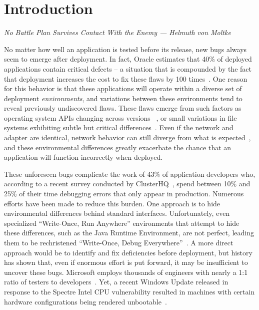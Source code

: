 \section{Introduction}
\label{SEC:introduction}
\textit{No Battle Plan Survives Contact With the Enemy --- Helmuth von Moltke}

No matter how well an application is tested before its release,
new bugs always seem to emerge after deployment.
In fact, Oracle estimates that 40\% of deployed applications
contain critical defects -- a situation that is compounded
by the fact that deployment
increases the cost to fix these flaws by 100 times~\cite{OracleAppQuality}.
One reason for this behavior
is that these applications will operate within a diverse set of
deployment \emph{environments},
and variations between these environments tend to
reveal previously undiscovered flaws.
These flaws emerge from
such factors as
operating system APIs changing across versions
~\cite{LinuxGlibcChanges},
or small variations in file systems exhibiting subtle but critical
differences~\cite{EXT4Layout, AppleHFS}.
Even if the network and adapter are identical,
network behavior can still diverge from what is expected~\cite{vbox},
and these environmental differences greatly exacerbate
the chance that an application will function incorrectly when deployed.

These unforeseen bugs
complicate the work of 43\% of application developers who, according to a
recent survey conducted by ClusterHQ~\cite{ClusterHQSurvey},
spend between 10\% and 25\% of their time
debugging errors that only appear in production.
Numerous efforts have been made to reduce this burden.
One approach
is to hide environmental differences behind standard interfaces.
Unfortunately,
even specialized ``Write-Once, Run Anywhere'' environments
that attempt to hide these differences,
such as the Java Runtime Environment,
are not perfect,
leading them to be rechristened ``Write-Once, Debug Everywhere''~\cite{WODE}.
A more direct approach would be
to identify and fix deficiencies before deployment,
but history has shown that,
even if enormous effort is put forward,
it may be insufficient to uncover these bugs.
Microsoft employs thousands of engineers with nearly a
1:1 ratio of testers to developers~\cite{Page2009}.
Yet, a recent Windows Update released
in response to the Spectre Intel CPU vulnerability
resulted in machines with certain hardware configurations
being rendered unbootable~\cite{kb4056892}.

